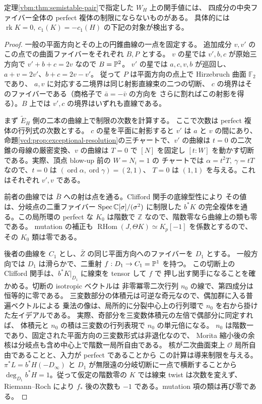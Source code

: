 \begin{proposition}[追加二成分での次数の不一致]\label{vbm:prop:extra-components}
定理\ref{vbm:thm:semistable-pair}で指定した $W_H$ 上の関手値には、
四成分の中央ファイバー全体の perfect 複体の制限にならないものがある。
具体的には $\operatorname{rk}K=0,\ c_1(K)=-c_1(H)$ の下記の対象が検出する。
\end{proposition}
\begin{proof}
一般の平面方向とその上の円錐曲線の一点を固定する。
追加成分 $v,v'$ のこの点での曲面ファイバーをそれぞれ $B,P$ とする。
$v$ の星では $v',b,c$ が原始三方向で $v'+b+c=2v$ なので $B=\mathbb P^2$。
$v'$ の星では $a,c,v,b$ が巡回し、$a+v=2v'$、$b+c=2v-v'$。
従って $P$ は平面方向の点上で Hirzebruch 曲面 $\mathbb F_2$ であり、
$a,v$ に対応する二境界は同じ射影直線束の二つの切断、
$c$ の境界はそのファイバーである（商格子で $\bar a=-\bar v$ の方向を
さらに割ればこの射影を得る）。$B$ 上では $v',c$ の境界はいずれも直線である。

まず $\widetilde E_H$ 側の二本の曲線上で制限の次数を計算する。
ここで次数は perfect 複体の行列式の次数とする。
$c$ の星を平面に射影すると $v'$ は $a$ と $v$ の間にあり、
命題\ref{vcd:prop:exceptional-resolution}の三チャートで、$v'$ の曲線は
$t=0$ の二次錐の母線の厳密変換、$v$ の曲線は $T=0$ で $[N]$ を固定し
$[t:W]$ を動かす切断である。実際、頂点 blow-up 前の $W=N_i=1$ の
チャートでは $\alpha=t^2T,\ \gamma=tT$ なので、$t=0$ は
$(\operatorname{ord}\alpha,\operatorname{ord}\gamma)=(2,1)$、
$T=0$ は $(1,1)$ を与える。これはそれぞれ $v',v$ である。

前者の曲線では $\bar B$ への射は点を通る。Clifford 関手の底線型性により
その値は、分岐点の二重ファイバー $\operatorname{Spec}\mathbb C[\sigma]/(\sigma^2)$
に制限した $b^*K$ の完全複体を通る。この局所環の perfect な $K_0$ は階数で
$\mathbb Z$ なので、階数零なら曲線上の類も零である。
mutation の補正も $\operatorname{RHom}(J,\Theta K)\simeq K_p[-1]$
を係数とするので、その $K_0$ 類は零である。

後者の曲線を $C_1$ とし、$\bar Z$ の同じ平面方向へのファイバーを $D_1$ とする。
一般方向では $D_1$ は滑らかで、二重射 $f:D_1\to C_1=\mathbb P^1$ を持つ。
この切断上の Clifford 関手は、$b^*K|_{D_1}$ に線束を tensor して $f$ で
押し出す関手になることを確かめる。切断の isotropic ベクトルは
非零冪零二次行列 $n_0$ の線で、第四成分は恒等的に零である。
三変数部分の体積元は可逆な奇元なので、偶加群に入る普遍ベクトルによる
乗法の像は、局所的に分裂中心上の行列環で $n_0$ を右から掛けた左イデアルである。
実際、奇部分を三変数体積元の左倍で偶部分に同定すれば、
体積元と $n_0$ の積は三変数の行列表現で $n_0$ の単元倍になる。
$n_0$ は階数一であり、固定された平面方向の三変数形式は非退化なので、
Morita 縮小後の余核は分岐点も含め中心上で階数一局所自由である。
核が二次曲面束上 $\mathcal O$ 局所自由であることと、入力が perfect であることから
この計算は導来制限を与える。
$\pi^*L=b^*H(-D_\infty)$ と $D_1$ が無限遠の分岐切断に一点で横断することから
$\deg_{D_1}b^*H=1$。従って仮定の階数零の $K$ では線束 twist は次数を変えず、
Riemann--Roch により $f_*$ 後の次数も $-1$ である。mutation 項の類は再び零である。


\end{proof}
